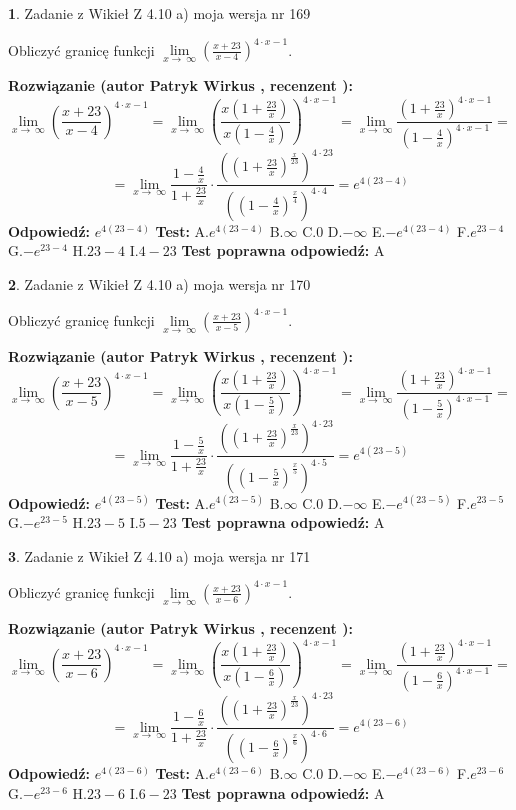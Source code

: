 \documentclass[12pt, a4paper]{article}
\theoremstyle{definition} %
\newtheorem{zad}{}
\newcommand{\zadStart}[1]{\begin{zad}#1\newline}
\newcommand{\zadStop}{\end{zad}}
\newcommand{\rozwStart}[2]{\noindent \textbf{Rozwiązanie (autor #1 , recenzent #2): }\newline}
\newcommand{\rozwStop}{\newline}
\newcommand{\odpStart}{\noindent \textbf{Odpowiedź:}\newline}
\newcommand{\odpStop}{\newline}
\newcommand{\testStart}{\noindent \textbf{Test:}\newline}
\newcommand{\testStop}{\newline}
\newcommand{\kluczStart}{\noindent \textbf{Test poprawna odpowiedź:}\newline}
\newcommand{\kluczStop}{\newline}
\begin{document}
\zadStart{Zadanie z Wikieł Z 4.10 a) moja wersja nr 169}


Obliczyć granicę funkcji  $\lim\limits_{x\to\ \infty}(\frac{x+23}{x-4})^{4\cdot x-1}$.
\zadStop
\rozwStart{Patryk Wirkus}{}
$$\lim\limits_{x\to\ \infty}(\frac{x+23}{x-4})^{4\cdot x-1} = \lim\limits_{x\to\ \infty}(\frac{x(1+\frac{23}{x})}{x(1-\frac{4}{x})})^{4\cdot x-1}=\lim\limits_{x\to\ \infty}\frac{(1+\frac{23}{x})^{4\cdot x-1}}{(1-\frac{4}{x})^{4\cdot x-1}}=$$
$$=\lim\limits_{x\to\ \infty}\frac{1-\frac{4}{x}}{1+\frac{23}{x}}\cdot\frac{((1+\frac{23}{x})^{\frac{x}{23}})^{4\cdot23}}{((1-\frac{4}{x})^{\frac{x}{4}})^{4\cdot4}}=e^{4(23-4)}$$
\rozwStop
\odpStart
$e^{4(23-4)}$
\odpStop
\testStart
A.$e^{4(23-4)}$ B.$\infty$ C.$0$ D.$-\infty$ E.$-e^{4(23-4)}$
F.$e^{23-4}$ G.$-e^{23-4}$
H.$23-4$
I.$4-23$
\testStop
\kluczStart
A
\kluczStop



\zadStart{Zadanie z Wikieł Z 4.10 a) moja wersja nr 170}


Obliczyć granicę funkcji  $\lim\limits_{x\to\ \infty}(\frac{x+23}{x-5})^{4\cdot x-1}$.
\zadStop
\rozwStart{Patryk Wirkus}{}
$$\lim\limits_{x\to\ \infty}(\frac{x+23}{x-5})^{4\cdot x-1} = \lim\limits_{x\to\ \infty}(\frac{x(1+\frac{23}{x})}{x(1-\frac{5}{x})})^{4\cdot x-1}=\lim\limits_{x\to\ \infty}\frac{(1+\frac{23}{x})^{4\cdot x-1}}{(1-\frac{5}{x})^{4\cdot x-1}}=$$
$$=\lim\limits_{x\to\ \infty}\frac{1-\frac{5}{x}}{1+\frac{23}{x}}\cdot\frac{((1+\frac{23}{x})^{\frac{x}{23}})^{4\cdot23}}{((1-\frac{5}{x})^{\frac{x}{5}})^{4\cdot5}}=e^{4(23-5)}$$
\rozwStop
\odpStart
$e^{4(23-5)}$
\odpStop
\testStart
A.$e^{4(23-5)}$ B.$\infty$ C.$0$ D.$-\infty$ E.$-e^{4(23-5)}$
F.$e^{23-5}$ G.$-e^{23-5}$
H.$23-5$
I.$5-23$
\testStop
\kluczStart
A
\kluczStop



\zadStart{Zadanie z Wikieł Z 4.10 a) moja wersja nr 171}


Obliczyć granicę funkcji  $\lim\limits_{x\to\ \infty}(\frac{x+23}{x-6})^{4\cdot x-1}$.
\zadStop
\rozwStart{Patryk Wirkus}{}
$$\lim\limits_{x\to\ \infty}(\frac{x+23}{x-6})^{4\cdot x-1} = \lim\limits_{x\to\ \infty}(\frac{x(1+\frac{23}{x})}{x(1-\frac{6}{x})})^{4\cdot x-1}=\lim\limits_{x\to\ \infty}\frac{(1+\frac{23}{x})^{4\cdot x-1}}{(1-\frac{6}{x})^{4\cdot x-1}}=$$
$$=\lim\limits_{x\to\ \infty}\frac{1-\frac{6}{x}}{1+\frac{23}{x}}\cdot\frac{((1+\frac{23}{x})^{\frac{x}{23}})^{4\cdot23}}{((1-\frac{6}{x})^{\frac{x}{6}})^{4\cdot6}}=e^{4(23-6)}$$
\rozwStop
\odpStart
$e^{4(23-6)}$
\odpStop
\testStart
A.$e^{4(23-6)}$ B.$\infty$ C.$0$ D.$-\infty$ E.$-e^{4(23-6)}$
F.$e^{23-6}$ G.$-e^{23-6}$
H.$23-6$
I.$6-23$
\testStop
\kluczStart
A
\kluczStop
\end{document}
